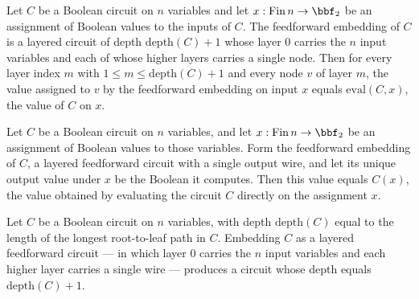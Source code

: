 \begin{theorem}
\label{BoolCircuit.Circuit.toFeedForward_evalNode_const}
\leanok
{}
Let $C$ be a Boolean circuit on $n$ variables and let $x : \mathrm{Fin}\,n \to \bbf_2$
be an assignment of Boolean values to the inputs of $C$. The feedforward embedding of
$C$ is a layered circuit of depth $\mathrm{depth}(C) + 1$ whose layer $0$ carries the
$n$ input variables and each of whose higher layers carries a single node. Then for
every layer index $m$ with $1 \le m \le \mathrm{depth}(C) + 1$ and every node $v$ of
layer $m$, the value assigned to $v$ by the feedforward embedding on input $x$ equals
$\mathrm{eval}(C, x)$, the value of $C$ on $x$.
\end{theorem}

\begin{theorem}
\label{BoolCircuit.Circuit.toFeedForward_eval}
\leanok
{}
Let $C$ be a Boolean circuit on $n$ variables, and let $x : \mathrm{Fin}\,n \to \bbf_2$
be an assignment of Boolean values to those variables. Form the feedforward embedding of
$C$, a layered feedforward circuit with a single output wire, and let its unique output
value under $x$ be the Boolean it computes. Then this value equals $C(x)$, the value
obtained by evaluating the circuit $C$ directly on the assignment $x$.
\end{theorem}

\begin{theorem}
\label{BoolCircuit.Circuit.toFeedForward_depth}
\leanok
{}
Let $C$ be a Boolean circuit on $n$ variables, with depth $\mathrm{depth}(C)$ equal to
the length of the longest root-to-leaf path in $C$. Embedding $C$ as a layered
feedforward circuit — in which layer $0$ carries the $n$ input variables and each higher
layer carries a single wire — produces a circuit whose depth equals $\mathrm{depth}(C) +
1$.
\end{theorem}

